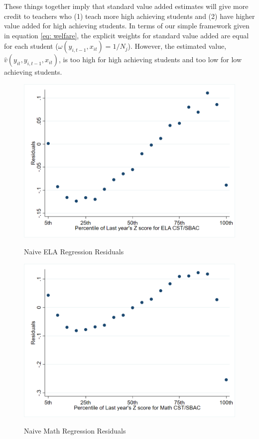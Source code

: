 \documentclass[letterpaper,12pt]{article}
\begin{document}
These things together imply that standard value added estimates will give more credit to teachers who (1) teach more high achieving students and (2) have higher value added for high achieving students. In terms of our simple framework given in equation \ref{eq: welfare}, the explicit weights for standard value added are equal for each student ($\omega(y_{i,t-1}, x_{it}) = 1/N_j$). However, the estimated value, $\hat{v}(y_{it}, y_{i,t-1}, x_{it})$, is too high for high achieving students and too low for low achieving students.

\begin{figure}[ht]
    \centering
    \caption{Naive ELA Regression Residuals}
    \includegraphics[width=\textwidth]{figures/ELA_Resid_Naive.png}
    \label{fig: ELA resid Naive}
\end{figure}

\begin{figure}[ht]
    \centering
    \caption{Naive Math Regression Residuals}
    \includegraphics[width=\textwidth]{figures/Math_Resid_Naive.png}
    \label{fig: Math resid Naive}
\end{figure}
\end{document}
